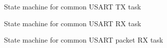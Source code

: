 \documentclass{article}
\begin{document}
\begin{figure}[H]
  \centering
  \caption{State machine for common USART TX task}
  
  \label{sm:10}
\end{figure}

\begin{figure}[H]
  \centering
  \caption{State machine for common USART RX task}
  
  \label{sm:11}
\end{figure}

\begin{figure}[H]
  \centering
  \caption{State machine for common USART packet RX task}
  
  \label{sm:12}
\end{figure}
\end{document}
